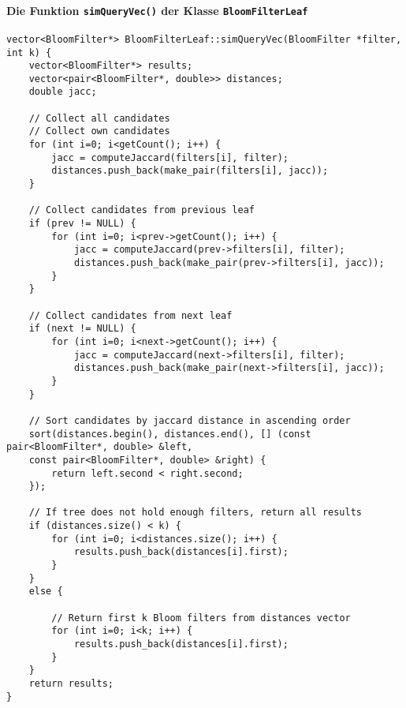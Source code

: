 \paragraph*{Die Funktion \texttt{simQueryVec()} der Klasse \texttt{BloomFilterLeaf}}
\small{
\begin{verbatim}
vector<BloomFilter*> BloomFilterLeaf::simQueryVec(BloomFilter *filter, int k) {
    vector<BloomFilter*> results;
    vector<pair<BloomFilter*, double>> distances;
    double jacc;
    
    // Collect all candidates
    // Collect own candidates
    for (int i=0; i<getCount(); i++) {
        jacc = computeJaccard(filters[i], filter);
        distances.push_back(make_pair(filters[i], jacc));
    }
    
    // Collect candidates from previous leaf
    if (prev != NULL) {
        for (int i=0; i<prev->getCount(); i++) {
            jacc = computeJaccard(prev->filters[i], filter);
            distances.push_back(make_pair(prev->filters[i], jacc));
        }
    }
    
    // Collect candidates from next leaf
    if (next != NULL) {
        for (int i=0; i<next->getCount(); i++) {
            jacc = computeJaccard(next->filters[i], filter);
            distances.push_back(make_pair(next->filters[i], jacc));
        }
    }
    
    // Sort candidates by jaccard distance in ascending order
    sort(distances.begin(), distances.end(), [] (const pair<BloomFilter*, double> &left, 
    const pair<BloomFilter*, double> &right) {
        return left.second < right.second;
    });
    
    // If tree does not hold enough filters, return all results
    if (distances.size() < k) {
        for (int i=0; i<distances.size(); i++) {
            results.push_back(distances[i].first);
        }
    }
    else {
        
        // Return first k Bloom filters from distances vector
        for (int i=0; i<k; i++) {
            results.push_back(distances[i].first);
        }
    }
    return results;
}
\end{verbatim}
}